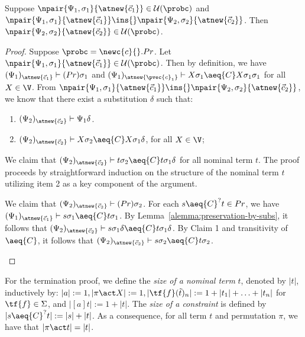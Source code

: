 \begin{lemma}\label{alemma:closure-by-instantiation}
    Suppose $\npair{\Psi_1,\sigma_1}{\atnew{\vec{c}_1}}\in \mathcal{U}(\probc)$ and $\npair{\Psi_1,\sigma_1}{\atnew{\vec{c}_1}} \ins{} \npair{\Psi_2,\sigma_2}{\atnew{\vec{c}_2}}$. Then $ \npair{\Psi_2,\sigma_2}{\atnew{\vec{c}_2}} \in \mathcal{U}(\probc)$.
\end{lemma}

\begin{proof}
     Suppose $\probc = \newc{c}{}.Pr$. Let $\npair{\Psi_1,\sigma_1}{\atnew{\vec{c}_1}}\in \mathcal{U}(\probc)$. Then by definition, we have $(\Psi_1)_{\atnew{\vec{c}_1}} \vdash (Pr)\sigma_1$ and $(\Psi_1)_{\atnew{\pvec{c}_1}} \vdash X\sigma_1 \aeq{C} X\sigma_1\sigma_1$ for all $X\in \V$. From  $\npair{\Psi_1,\sigma_1}{\atnew{\vec{c}_1}} \ins{} \npair{\Psi_2,\sigma_2}{\atnew{\vec{c}_2}}$, we know that there exist a substitution $\delta$ such that:

     \begin{enumerate}
         \item $(\Psi_2)_{\atnew{\vec{c}_2}}\vdash \Psi_1\delta$.

         \item $(\Psi_2)_{\atnew{\vec{c}_2}}\vdash X\sigma_2\aeq{C}X\sigma_1\delta$, for all $X\in \V$;
     \end{enumerate}

     \begin{claim}[1]
          We claim that $(\Psi_2)_{\atnew{\vec{c}_2}}\vdash t\sigma_2\aeq{C}t\sigma_1\delta$ for all nominal term $t$. The proof proceeds by straightforward induction on the structure of the nominal term $t$ utilizing item 2 as a key component of the argument.
     \end{claim}

     \begin{claim}[2]
          We claim that $(\Psi_2)_{\atnew{\vec{c}_2}} \vdash (Pr)\sigma_2$. For each $s\aeq{C}^?  t\in Pr$, we have $(\Psi_1)_{\atnew{\vec{c}_1}} \vdash s\sigma_1 \aeq{C} t\sigma_1$. By Lemma~\ref{alemma:preservation-by-subs}, it follows that $(\Psi_2)_{\atnew{\vec{c}_2}} \vdash s\sigma_1\delta \aeq{C} t\sigma_1\delta$. By Claim 1 and transitivity of $\aeq{C}$, it follows that $(\Psi_2)_{\atnew{\vec{c}_2}} \vdash s\sigma_2 \aeq{C} t\sigma_2$. 
     \end{claim}
\end{proof}

For the  termination proof, we define the \emph{size of a nominal term} $t$, denoted by $|t|$, inductively by: $|a| := 1, |\pi\act X| := 1, |\tf{f}(\tilde{t})_n| := 1+|t_1|+\ldots+|t_n|$ for $\tf{f}\in\Sigma$, and $|[a]t| := 1+|t|$. 
The \emph{size of a constraint} is defined by $|s\aeq{C}^? t| := |s|+|t|$. As a consequence, for all term $t$ and permutation $\pi$, we have that $|\pi\act t| = |t|$.

